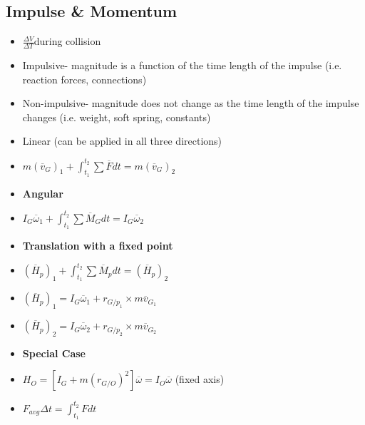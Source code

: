 \documentclass [10pt] {article}
\begin{document}
\begin{multicols*}{2}
\section{Impulse \& Momentum}
	\begin{itemize}
		\item $\frac{\Delta V}{\Delta T} $during collision 
		\item Impulsive- magnitude is a function of the time length of the impulse (i.e. reaction forces, connections)
		\item Non-impulsive- magnitude does not change as the time length of the impulse changes (i.e. weight, soft spring, constants) 
		\item Linear (can be applied in all three directions)
		\item $m(\overline{v}_G)_1 + \int_{t_1}^{t_2} \sum \overline{F}dt = m(\overline{v}_G)_2 $
		\item \textbf{Angular}
		\item $I_G\overline{\omega}_1 + \int_{t_1}^{t_2} \sum \overline{M}_G dt = I_G\overline{\omega}_2$ 
		\item \textbf{Translation with a fixed point }
		\item $(\overline{H}_p)_1 + \int_{t_1}^{t_2} \sum \overline{M}_p dt = (\overline{H}_p)_2 $
		\item $(\overline{H}_p)_1 = I_G\overline{\omega}_1 + r_{{G/p}_1}\times m\overline{v}_{G_1} $
		\item $(\overline{H}_p)_2 = I_G\overline{\omega}_2 + r_{{G/p}_2}\times m\overline{v}_{G_2} $
		\item \textbf{Special Case}
		\item  $H_O = [I_G + m(r_{G/O})^2]\overline{\omega} = I_O\overline{\omega} $ (fixed axis) 
		\item $F_{avg}\Delta t = \int_{t_1}^{t_2} Fdt$\\\\
	\end{itemize}

\end{multicols*}
\end{document}
